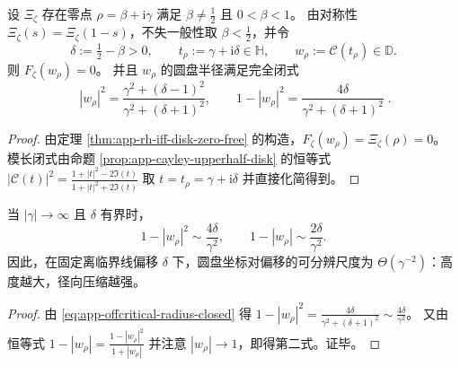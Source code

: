 \begin{proposition}[离临界线偏移的圆盘半径闭式压缩]\label{prop:app-offcritical-radius-compression}
设 \(\Xi_{\zeta}\) 存在零点 \(\rho=\beta+\mathrm{i}\gamma\) 满足 \(\beta\neq\tfrac12\) 且 \(0<\beta<1\)。
由对称性 \(\Xi_{\zeta}(s)=\Xi_{\zeta}(1-s)\)，不失一般性取 \(\beta<\tfrac12\)，并令
\[
\delta:=\tfrac12-\beta>0,
\qquad
t_{\rho}:=\gamma+\mathrm{i}\delta\in\mathbb{H},
\qquad
w_{\rho}:=\mathcal{C}(t_{\rho})\in\mathbb{D}.
\]
则 \(F_{\zeta}(w_{\rho})=0\)。
并且 \(w_{\rho}\) 的圆盘半径满足完全闭式
\begin{equation}\label{eq:app-offcritical-radius-closed}
\boxed{\;
|w_{\rho}|^{2}
=\frac{\gamma^{2}+(\delta-1)^{2}}{\gamma^{2}+(\delta+1)^{2}},
\qquad
1-|w_{\rho}|^{2}
=\frac{4\delta}{\gamma^{2}+(\delta+1)^{2}}\; }.
\end{equation}
\end{proposition}
\begin{proof}
由定理 \ref{thm:app-rh-iff-disk-zero-free} 的构造，\(F_{\zeta}(w_{\rho})=\Xi_{\zeta}(\rho)=0\)。
模长闭式由命题 \ref{prop:app-cayley-upperhalf-disk} 的恒等式
\(
|\mathcal{C}(t)|^{2}=\frac{1+|t|^{2}-2\Im(t)}{1+|t|^{2}+2\Im(t)}
\)
取 \(t=t_{\rho}=\gamma+\mathrm{i}\delta\) 并直接化简得到。
\end{proof}

\begin{corollary}[高高度压缩尺度]\label{cor:app-offcritical-radius-high-height}
当 \(|\gamma|\to\infty\) 且 \(\delta\) 有界时，
\[
1-|w_{\rho}|^{2}\sim \frac{4\delta}{\gamma^{2}},
\qquad
1-|w_{\rho}|\sim \frac{2\delta}{\gamma^{2}}.
\]
因此，在固定离临界线偏移 \(\delta\) 下，圆盘坐标对偏移的可分辨尺度为 \(\Theta(\gamma^{-2})\)：高度越大，径向压缩越强。
\end{corollary}
\begin{proof}
由 \eqref{eq:app-offcritical-radius-closed} 得
\(
1-|w_{\rho}|^{2}=\frac{4\delta}{\gamma^{2}+(\delta+1)^{2}}
\sim \frac{4\delta}{\gamma^{2}}
\)。
又由恒等式
\(
1-|w_{\rho}|=\frac{1-|w_{\rho}|^{2}}{1+|w_{\rho}|}
\)
并注意 \(|w_{\rho}|\to 1\)，即得第二式。证毕。
\end{proof}

